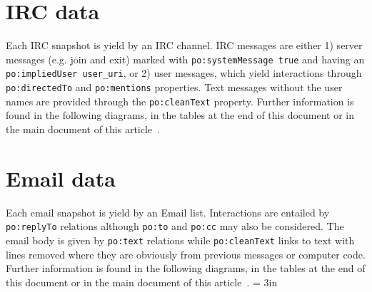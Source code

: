 \documentclass[review]{elsarticle}
\newcommand{\te}[1] {\texttt{\footnotesize#1}}
\begin{document}
\section{IRC data}
Each IRC snapshot is yield by an IRC channel.
IRC messages are either 1) server messages (e.g. join and exit)
marked with \te{po:systemMessage true} and having an \te{po:impliedUser user\_uri},
or 2) user messages, which yield interactions through \te{po:directedTo} and \te{po:mentions} properties.
Text messages without the user names are provided through the \te{po:cleanText} property.
Further information is found in the following diagrams, in the tables at
the end of this document or in the main document of this article~\cite{losd}.

\section{Email data}
Each email snapshot is yield by an Email list.
Interactions are entailed by \te{po:replyTo} relations
although \te{po:to} and \te{po:cc} may also be considered.
The email body is given by \te{po:text} relations while
\te{po:cleanText} links to text with lines removed where they are
obviously from previous messages or computer code.
Further information is found in the following diagrams, in the tables at
the end of this document or in the main document of this article~\cite{losd}.
\textheight = 3in
\pdfpageheight 6in
\end{document}
